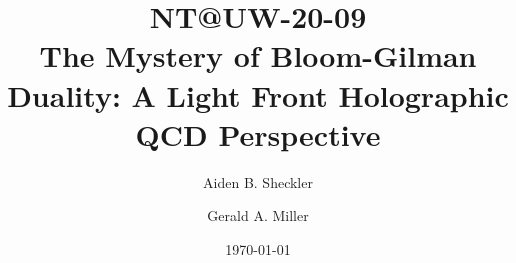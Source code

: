 \documentclass[aps,prd,amsmath,longbibliography]{revtex4-1}
\begin{document}


\title{NT@UW-20-09\\The Mystery of Bloom-Gilman Duality:  A   Light Front Holographic QCD Perspective}


\author{Aiden B.  Sheckler }

\author{Gerald A. Miller}


\date{\today}
\end{document}

